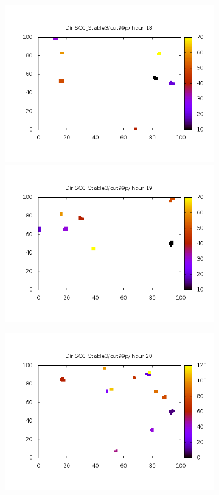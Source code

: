\documentclass[10pt,a4paper]{article}
\begin{document}
\begin{figure}
\centering
\begin{subfigure}[b]{1\textwidth}
\includegraphics[scale=.4]{./img/SCC_Stable3/cut99p/18.png}
\includegraphics[scale=.4]{./img/SCC_Stable3/cut99p/19.png}
\end{subfigure}
\begin{subfigure}[b]{1\textwidth}
\includegraphics[scale=.4]{./img/SCC_Stable3/cut99p/20.png}

\end{subfigure}
\end{figure}
\end{document}
